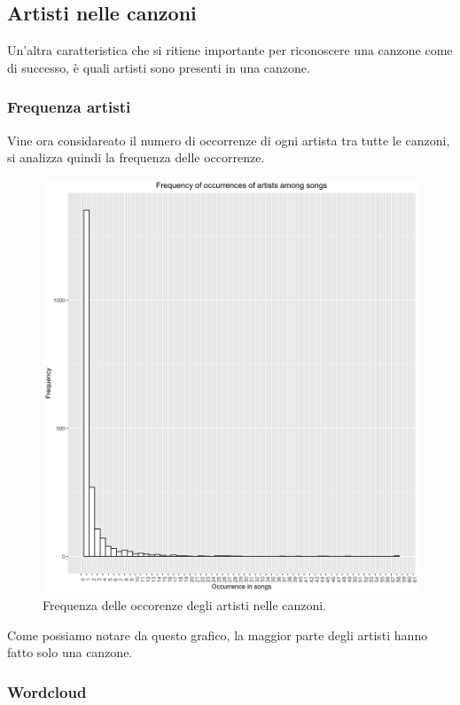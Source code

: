 \subsection{Artisti nelle canzoni}
Un'altra caratteristica che si ritiene importante per riconoscere una canzone come di successo, è quali artisti sono presenti in una canzone.
\subsubsection{Frequenza artisti}
\label{sec:freq_artisti}
Vine ora considareato il numero di occorrenze di ogni artista tra tutte le canzoni, si analizza quindi la frequenza delle occorrenze.

\begin{figure}[H]
	\centering
	\includegraphics[width=13cm]{../images/artists_occurence.png}
	\caption{Frequenza delle occorenze degli artisti nelle canzoni.}
\end{figure}

Come possiamo notare da questo grafico, la maggior parte degli artisti hanno fatto solo una canzone.
\subsubsection{Wordcloud}


